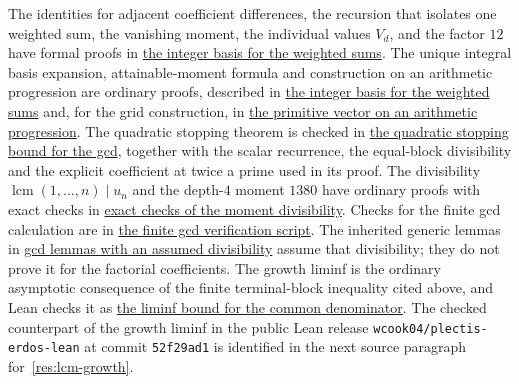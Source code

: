 \documentclass[11pt]{article}
\begin{document}
\begingroup\small\raggedright
The identities for adjacent coefficient differences, the recursion that
isolates one weighted sum, the vanishing moment, the individual values
$V_d$, and the factor $12$ have formal proofs in
\href{https://github.com/wcook04/plectis-erdos/blob/f36a98bf3d3e6f65f1074e3b800e3293d5b8a51a/ErdosProblems/Erdos68/DivisorChannelBasis.lean}{the integer basis for the weighted sums}.  The unique integral basis expansion,
attainable-moment formula and construction on an arithmetic progression are
ordinary proofs, described in \href{https://github.com/wcook04/plectis-erdos/blob/f36a98bf3d3e6f65f1074e3b800e3293d5b8a51a/ErdosProblems/Erdos68/DivisorChannelBasis.md}{the integer basis for the weighted sums} and, for the
grid construction, in
\href{https://github.com/wcook04/plectis-erdos/blob/f36a98bf3d3e6f65f1074e3b800e3293d5b8a51a/ErdosProblems/Erdos68/CompressedPrimitiveChannelKernel.md}{the primitive vector on an arithmetic progression}.  The quadratic stopping theorem
is checked in \href{https://github.com/wcook04/plectis-erdos/blob/f36a98bf3d3e6f65f1074e3b800e3293d5b8a51a/ErdosProblems/Erdos68/PaperCompleteMomentHorizon.lean}{the quadratic stopping bound for the gcd}, together with the
scalar recurrence, the equal-block divisibility and the explicit coefficient
at twice a prime used in its proof.
The divisibility $\operatorname{lcm}(1,\ldots,n)\mid u_n$ and the depth-$4$
moment $1380$ have ordinary proofs with exact checks in \href{https://github.com/wcook04/plectis-erdos/blob/f36a98bf3d3e6f65f1074e3b800e3293d5b8a51a/ErdosProblems/Erdos68/scripts/check_moment_saturation.py}{exact checks of the moment divisibility}.
Checks for the finite gcd calculation are in \href{https://github.com/wcook04/plectis-erdos/blob/f36a98bf3d3e6f65f1074e3b800e3293d5b8a51a/ErdosProblems/Erdos68/scripts/check_finite_source.py}{the finite gcd verification script}.
The inherited generic lemmas in \href{https://github.com/wcook04/plectis-erdos/blob/f36a98bf3d3e6f65f1074e3b800e3293d5b8a51a/ErdosProblems/Erdos68/TailIdealCertificate.lean}{gcd lemmas with an assumed divisibility} assume
that divisibility; they do not prove it for the factorial coefficients.
The growth liminf is the ordinary asymptotic consequence of the finite
terminal-block inequality cited above, and Lean checks it as
\href{https://github.com/wcook04/plectis-erdos/blob/0b500c7cf8e8bb7ae343484378df02f277fb8194/lean/ErdosProblems/Erdos68/PaperCompleteLiminf.lean#L42}{the liminf bound for the common denominator}.
The checked counterpart of the growth liminf in the public Lean release
\nolinkurl{wcook04/plectis-erdos-lean} at commit \texttt{52f29ad1} is
identified in the next source paragraph for~\eqref{res:lcm-growth}.
\end{document}
